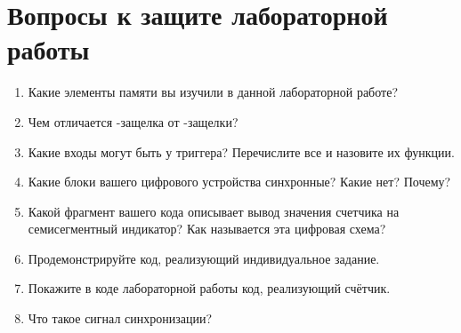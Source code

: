 \section{Вопросы к защите лабораторной работы}

\begin{enumerate}[noitemsep,topsep=0pt, after=\vspace{2pt}]
  \item Какие элементы памяти вы изучили в данной лабораторной работе?
  \item Чем отличается -защелка от -защелки?
  \item Какие входы могут быть у триггера? Перечислите все и назовите их функции.
  \item Какие блоки вашего цифрового устройства синхронные? Какие нет? Почему?
  \item Какой фрагмент вашего кода описывает вывод значения счетчика на семисегментный индикатор? Как называется эта цифровая схема?
  \item Продемонстрируйте код, реализующий индивидуальное задание.
  \item Покажите в коде лабораторной работы код, реализующий счётчик.
  \item Что такое сигнал синхронизации?
\end{enumerate}
